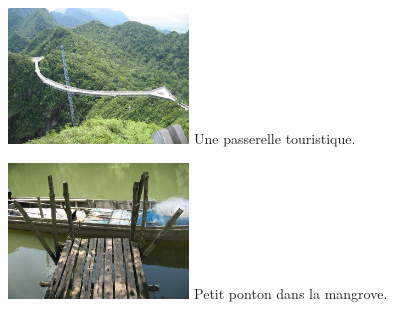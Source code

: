 \begin{multicols}{2}
\hspace*{-0.65cm}
\includegraphics[width=4.8cm]{articles/langkawi/1212398042f2k1.jpg}
Une passerelle touristique.

\hspace*{-0.65cm}
\includegraphics[width=4.8cm]{articles/langkawi/1212397931akoQ.jpg}
Petit ponton dans la mangrove.

\end{multicols}


